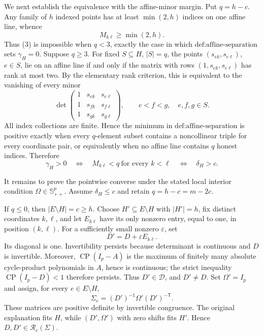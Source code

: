 We next establish the equivalence with the affine-minor margin.  Put \(q=h-c\).  Any family of \(h\) indexed points has at least \(\min(2,h)\) indices on one affine line, whence
\[
 M_{k\ell}\ge\min(2,h). \tag{5}
\]
Thus (3) is impossible when \(q<3\), exactly the case in which \(\text{def:affine-separation}\) sets \(\gamma_H=0\).  Suppose \(q\ge3\).  For fixed \(S\subseteq H\), \(|S|=q\), the points \((s_{ek},s_{e\ell})\), \(e\in S\), lie on an affine line if and only if the matrix with rows \((1,s_{ek},s_{e\ell})\) has rank at most two.  By the elementary rank criterion, this is equivalent to the vanishing of every minor
\[
 \det\!\begin{pmatrix}
 1&s_{ek}&s_{e\ell}\\
 1&s_{fk}&s_{f\ell}\\
 1&s_{gk}&s_{g\ell}
 \end{pmatrix},
 \qquad e<f<g,\quad e,f,g\in S. \tag{6}
\]
All index collections are finite.  Hence the minimum in \(\text{def:affine-separation}\) is positive exactly when every \(q\)-element subset contains a noncollinear triple for every coordinate pair, or equivalently when no affine line contains \(q\) honest indices.  Therefore
\[
 \gamma_H>0
 \quad\Longleftrightarrow\quad
 M_{k\ell}<q\ \text{for every }k<\ell
 \quad\Longleftrightarrow\quad
 \delta_H>c. \tag{7}
\]

It remains to prove the pointwise converse under the stated local interior condition \(\Omega\in\mathbb S_{++}^p\).  Assume \(\delta_H\le c\) and retain \(q=h-c=m-2c\).

If \(q\le0\), then \(|E\setminus H|=c\ge h\).  Choose \(H'\subseteq E\setminus H\) with \(|H'|=h\), fix distinct coordinates \(k,\ell\), and let \(E_{k\ell}\) have its only nonzero entry, equal to one, in position \((k,\ell)\).  For a sufficiently small nonzero \(\varepsilon\), set
\[
 D'=D+\varepsilon E_{k\ell}. \tag{8}
\]
Its diagonal is one.  Invertibility persists because determinant is continuous and \(D\) is invertible.  Moreover, \(\operatorname{CP}(I_p-A)\) is the maximum of finitely many absolute cycle-product polynomials in \(A\), hence is continuous; the strict inequality \(\operatorname{CP}(I_p-D)<1\) therefore persists.  Thus \(D'\in\mathcal D\), and \(D'\ne D\).  Set \(\Omega'=I_p\) and assign, for every \(e\in E\setminus H\),
\[
 \Sigma_e=(D')^{-1}\Omega'(D')^{-\mathsf T}. \tag{9}
\]
These matrices are positive definite by invertible congruence.  The original explanation fits \(H\), while \((D',\Omega')\) with zero shifts fits \(H'\).  Hence \(D,D'\in\mathcal R_c(\Sigma)\).

